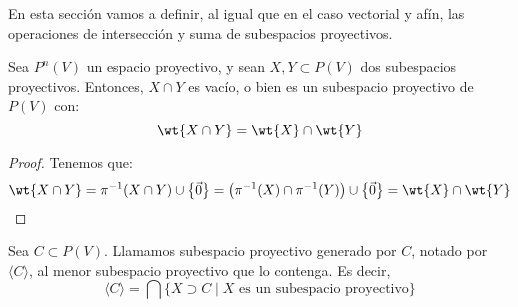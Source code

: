 En esta sección vamos a definir, al igual que en el caso vectorial y afín, las operaciones de intersección y suma de subespacios proyectivos.
\begin{prop}[Intersección]
    Sea $P^n(V)$ un espacio proyectivo, y sean $X,Y\subset P(V)$ dos subespacios proyectivos. Entonces, $X\cap Y$ es vacío, o bien es un subespacio proyectivo de $P(V)$ con:
    \begin{equation*}
        \wt{X\cap Y} = \wt{X} \cap \wt{Y}
    \end{equation*}
\end{prop}
\begin{proof}
    Tenemos que:
    \begin{equation*}
        \wt{X\cap Y} = \pi^{-1}(X\cap Y) \cup \left\{\vec{0}\right\} = \left(\pi^{-1}(X)\cap \pi^{-1}(Y)\right) \cup \left\{\vec{0}\right\} = \wt{X} \cap \wt{Y}
    \end{equation*}
\end{proof}

\begin{definicion}
    Sea $C\subset P(V)$. Llamamos subespacio proyectivo generado por $C$, notado por $\langle C \rangle$, al menor subespacio proyectivo que lo contenga. Es decir,
    \begin{equation*}
        \langle C \rangle = \bigcap \{X\supset C\mid X\text{ es un subespacio proyectivo}\}
    \end{equation*}
\end{definicion}

